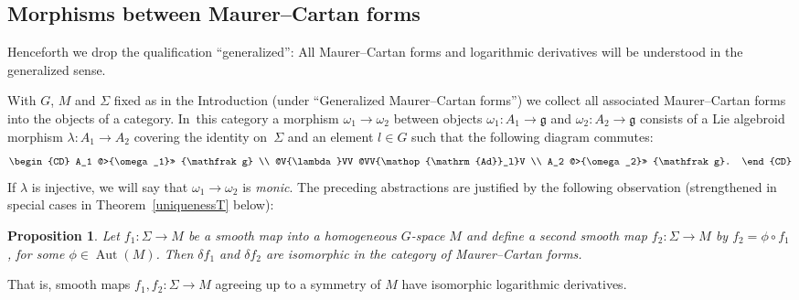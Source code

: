 \documentclass[pdftex]{sigma}%
\numberwithin{equation}{section}
\newtheorem{Proposition}[Theorem]{Proposition}
\DeclareMathOperator{\Adjoint}{Ad}
\DeclareMathOperator{\automorphism}{Aut}
\begin{document}
\subsection*{Morphisms between Maurer--Cartan forms}

Henceforth we drop the qualification ``generalized'': All Maurer--Cartan
forms and logarithmic derivatives will be understood in the
generalized sense.

With $G$, $M$ and $\Sigma $ fixed as in the Introduction (under
``Generalized Maurer--Cartan forms'') we collect all associated
Maurer--Cartan forms into the objects of a category. In~this category a
morphism $\omega_1 \rightarrow \omega_2$ between objects
$\omega_1 \colon A_1 \rightarrow {\mathfrak g} $ and
$\omega_2 \colon A_2 \rightarrow {\mathfrak g} $ consists of a Lie
algebroid morphism $\lambda \colon A_1 \rightarrow A_2$ covering the
identity on~$\Sigma $ and an element $l \in G$ such that the following
diagram commutes:
 \begin{equation*}
 \begin{CD} A_1 @>{\omega_1}>> {\mathfrak g} \\ @V{\lambda}VV
@VV{\Adjoint_l}V \\ A_2 @>{\omega_2}>> {\mathfrak g}.
 \end{CD}
 \end{equation*} If $\lambda$ is injective, we will say that $\omega_1
\rightarrow \omega_2$ is {\it monic}. The preceding abstractions are
justified by the following observation (strengthened in special cases
in Theorem~\ref{uniquenessT} below):

\begin{Proposition}\label{morphismsP}
 Let $f_1\colon \Sigma \rightarrow M$ be a smooth map into a
 homogeneous $G$-space $M$ and define a second smooth map
 $f_2 \colon \Sigma \rightarrow M$ by $f_2 = \phi\circ f_1$, for
 some $\phi \in \automorphism(M)$. Then $\delta f_1$ and $\delta f_2$
 are isomorphic in the category of Maurer--Cartan forms.
\end{Proposition}

That is, smooth maps $f_1,f_2 \colon \Sigma \rightarrow M$ agreeing up
to a symmetry of $M$ have isomorphic logarithmic derivatives.
\end{document}
